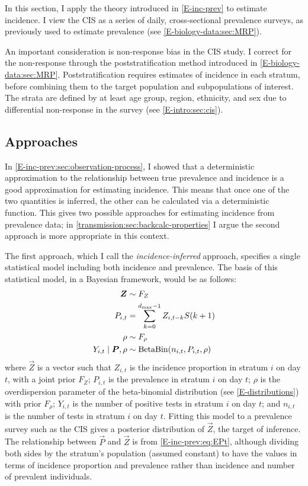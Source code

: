 \documentclass[thesis.tex]{subfiles}
\begin{document}
In this section, I apply the theory introduced in \cref{E-inc-prev} to estimate incidence.
I view the CIS as a series of daily, cross-sectional prevalence surveys, as previously used to estimate prevalence (see \cref{E-biology-data:sec:MRP}).

An important consideration is non-response bias in the CIS study.
I correct for the non-response through the poststratification method introduced in \cref{E-biology-data:sec:MRP}.
Poststratification requires estimates of incidence in each stratum, before combining them to the target population and subpopulations of interest.
The strata are defined by at least age group, region, ethnicity, and sex due to differential non-response in the survey (see \cref{E-intro:sec:cis}).

\subsection{Approaches} \label{backcalc:sec:approach}

In \cref{E-inc-prev:sec:observation-process}, I showed that a deterministic approximation to the relationship between true prevalence and incidence is a good approximation for estimating incidence.
This means that once one of the two quantities is inferred, the other can be calculated via a deterministic function.
This gives two possible approaches for estimating incidence from prevalence data; in \cref{transmission:sec:backcalc-properties} I argue the second approach is more appropriate in this context.


The first approach, which I call the \emph{incidence-inferred} approach, specifies a single statistical model including both incidence and prevalence.
The basis of this statistical model, in a Bayesian framework, would be as follows:
\begin{align}
    \bm{Z} &\sim F_Z \\
    P_{i,t}  &= \sum_{k=0}^{d_\text{max}-1} Z_{i,t-k} S(k+1) \\
    \rho &\sim F_\rho \\
    Y_{i,t} \mid \bm{P}, \rho &\sim \operatorname{BetaBin}(n_{i,t}, P_{i,t}, \rho)
\end{align}
where $\vec{Z}$ is a vector such that $Z_{i,t}$ is the incidence proportion in stratum $i$ on day $t$, with a joint prior $F_Z$; $P_{i,t}$ is the prevalence in stratum $i$ on day $t$; $\rho$ is the overdispersion parameter of the beta-binomial distribution (see \cref{E-distributions}) with prior $F_\rho$; $Y_{i,t}$ is the number of positive tests in stratum $i$ on day $t$; and $n_{i,t}$ is the number of tests in stratum $i$ on day $t$.
Fitting this model to a prevalence survey such as the CIS gives a posterior distribution of $\vec{Z}$, the target of inference.
The relationship between $\vec{P}$ and $\vec{Z}$ is from \cref{E-inc-prev:eq:EPt}, although dividing both sides by the stratum's population (assumed constant) to have the values in terms of incidence proportion and prevalence rather than incidence and number of prevalent individuals.
\end{document}
